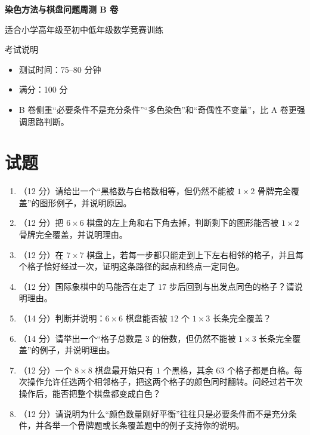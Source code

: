 \documentclass[11pt,a4paper,fontset=fandol]{ctexart}
\newcommand{\answerspace}{\vspace{2.3cm}}
\newcommand{\biganswerspace}{\vspace{3.1cm}}
\begin{document}
\thispagestyle{empty}
\begin{center}
{\fontsize{22}{28}\selectfont\bfseries 染色方法与棋盘问题周测 B 卷\par}
\vspace{0.4cm}
{\large 适合小学高年级至初中低年级数学竞赛训练\par}
\end{center}

\begin{infobox}{考试说明}
\begin{itemize}
  \item 测试时间：75--80 分钟
  \item 满分：100 分
  \item B 卷侧重“必要条件不是充分条件”“多色染色”和“奇偶性不变量”，比 A 卷更强调思路判断。
\end{itemize}
\end{infobox}

\section{试题}

\begin{enumerate}
  \item （12 分）请给出一个“黑格数与白格数相等，但仍然不能被 $1\times 2$ 骨牌完全覆盖”的图形例子，并说明原因。
  \answerspace

  \item （12 分）把 $6\times 6$ 棋盘的左上角和右下角去掉，判断剩下的图形能否被 $1\times 2$ 骨牌完全覆盖，并说明理由。
  \answerspace

  \item （12 分）在 $7\times 7$ 棋盘上，若每一步都只能走到上下左右相邻的格子，并且每个格子恰好经过一次，证明这条路径的起点和终点一定同色。
  \answerspace

  \item （12 分）国际象棋中的马能否在走了 $17$ 步后回到与出发点同色的格子？请说明理由。
  \answerspace

  \item （14 分）判断并说明：$6\times 6$ 棋盘能否被 $12$ 个 $1\times 3$ 长条完全覆盖？
  \biganswerspace

  \item （14 分）请举出一个“格子总数是 $3$ 的倍数，但仍然不能被 $1\times 3$ 长条完全覆盖”的例子，并说明理由。
  \biganswerspace

  \item （12 分）一个 $8\times 8$ 棋盘最开始只有 $1$ 个黑格，其余 $63$ 个格子都是白格。每次操作允许任选两个相邻格子，把这两个格子的颜色同时翻转。问经过若干次操作后，能否把整个棋盘都变成白色？
  \answerspace

  \item （12 分）请说明为什么“颜色数量刚好平衡”往往只是必要条件而不是充分条件，并各举一个骨牌题或长条覆盖题中的例子支持你的说明。
  \answerspace
\end{enumerate}
\end{document}
